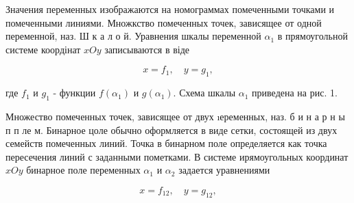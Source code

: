 \documentclass[10pt]{article}
\begin{document}
Значения переменных изображаются на номограммах помеченными точками и помеченными линиями. Множкство помеченных точек, зависящее от одной переменной, наз. Ш к а л о й. Уравнения шкалы переменной $\alpha_{1}$ в прямоугольной системе коордінат $x O y$ записываются в віде



\[

x=f_{1}, \quad y=g_{1},

\]



где $f_{1}$ и $g_{1}$ - функции $f\left(\alpha_{1}\right)$ и $g\left(\alpha_{1}\right)$. Схема шкалы $\alpha_{1}$ приведена на рис. 1.



Множество помеченных точек, зависящее от двух ıеременных, наз. б и н а р н ы п п ле м. Бинарное цоле обычно оформляется в виде сетки, состоящей из двух семейств помеченных линий. Точка в бинарном поле определяется как точка пересечения линий с заданными пометками. В системе ирямоугольных координат $x O y$ бинарное поле переменных $\alpha_{1}$ и $\alpha_{2}$ задается уравнениями



\[

x=f_{12}, \quad y=g_{12},

\]
\end{document}
